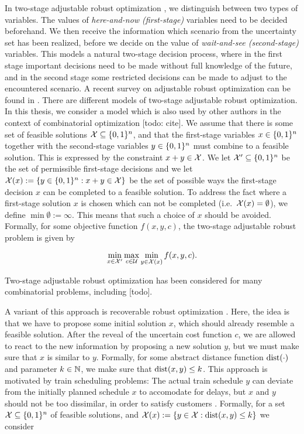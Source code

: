 In two-stage adjustable robust optimization \cite{ben2004adjustable}, we distinguish between two types of variables. The values of \emph{here-and-now (first-stage)} variables need to be decided beforehand. We then receive the information which scenario from the uncertainty set has been realized, before we decide on the value of \emph{wait-and-see (second-stage)} variables. 
This models a natural two-stage decision process, where in the first stage important decisions need to be made without full knowledge of the future, and in the second stage some restricted decisions can be made to adjust to the encountered scenario.
 A recent survey on adjustable robust optimization can be found in \cite{yanikouglu2019survey}.
There are different models of two-stage adjustable robust optimization. In this thesis, we consider a model which is also used by other authors in the context of combinatorial optimization [todo: cite]. 
We assume that there is some set of feasible solutions $\mathcal{X} \subseteq \{ 0,1 \}^n$, and that the first-stage variables $x \in \{ 0,1 \}^n$ together with the second-stage variables $y \in \{ 0,1 \}^n$ must combine to a feasible solution. This is expressed by the constraint $x + y \in \mathcal{X}$. 
We let $\mathcal{X}' \subseteq \{ 0,1 \}^n$ be the set of permissible first-stage decisions and we let $\mathcal{X}(x) := \{ y \in \{ 0,1 \}^n : x + y \in \mathcal{X} \}$ be the set of possible ways the first-stage decision $x$ can be completed to a feasible solution. 
To address the fact where a first-stage solution $x$ is chosen which can not be completed (i.e.\ $\mathcal{X}(x) = \emptyset$), we define $\min \emptyset := \infty$. This means that such a choice of $x$ should be avoided. Formally, for some objective function $f(x,y,c)$, the two-stage adjustable robust problem is given by

\[\min_{x \in \mathcal{X}'} \max_{c \in \mathcal{U}} \min_{y \in \mathcal{X}(x)} f(x,y,c).\]

Two-stage adjustable robust optimization has been considered for many combinatorial problems, including [todo]. 

A variant of this approach is recoverable robust optimization \cite{liebchen2009concept}. Here, the idea is that we have to propose some initial solution $x$, which should already resemble a feasible solution. 
After the reveal of the uncertain cost function $c$, we are allowed to react to the new information by proposing a new solution $y$, but we must make sure that $x$ is similar to $y$. Formally, for some abstract distance function $\operatorname{\text{dist}}(\cdot)$ and parameter $k \in \mathbb{N}$, we make sure that $\operatorname{\text{dist}}(x,y) \leq k$. This approach is motivated by train scheduling problems: The actual train schedule $y$ can deviate from the initially planned schedule $x$ to accomodate for delays, but $x$ and $y$ should not be too dissimilar, in order to satisfy customers \cite{liebchen2009concept}. Formally, for a set $\mathcal{X} \subseteq \{ 0,1 \}^n$ of feasible solutions, and $\mathcal{X}(x) := \{ y \in \mathcal{X} : \operatorname{\text{dist}}(x,y) \leq k \}$ we consider

